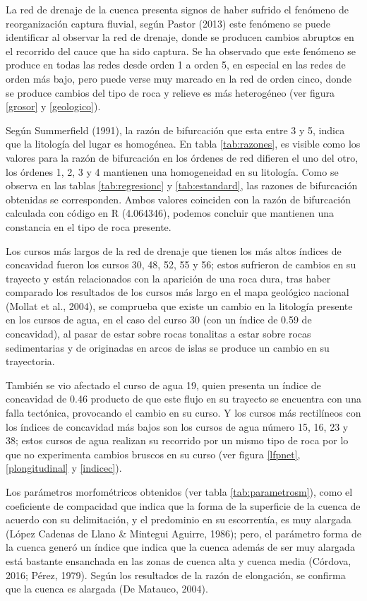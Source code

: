 \documentclass[11pt,]{article}
\begin{document}
La red de drenaje de la cuenca presenta signos de haber sufrido el
fenómeno de reorganización captura fluvial, según Pastor (2013) este
fenómeno se puede identificar al observar la red de drenaje, donde se
producen cambios abruptos en el recorrido del cauce que ha sido captura.
Se ha observado que este fenómeno se produce en todas las redes desde
orden 1 a orden 5, en especial en las redes de orden más bajo, pero
puede verse muy marcado en la red de orden cinco, donde se produce
cambios del tipo de roca y relieve es más heterogéneo (ver figura
\ref{grosor} y \ref{geologico}).

Según Summerfield (1991), la razón de bifurcación que esta entre 3 y 5,
indica que la litología del lugar es homogénea. En tabla
\ref{tab:razones}, es visible como los valores para la razón de
bifurcación en los órdenes de red difieren el uno del otro, los órdenes
1, 2, 3 y 4 mantienen una homogeneidad en su litología. Como se observa
en las tablas \ref{tab:regresionc} y \ref{tab:estandard}, las razones de
bifurcación obtenidas se corresponden. Ambos valores coinciden con la
razón de bifurcación calculada con código en R (4.064346), podemos
concluir que mantienen una constancia en el tipo de roca presente.

Los cursos más largos de la red de drenaje que tienen los más altos
índices de concavidad fueron los cursos 30, 48, 52, 55 y 56; estos
sufrieron de cambios en su trayecto y están relacionados con la
aparición de una roca dura, tras haber comparado los resultados de los
cursos más largo en el mapa geológico nacional (Mollat et al., 2004), se
comprueba que existe un cambio en la litología presente en los cursos de
agua, en el caso del curso 30 (con un índice de 0.59 de concavidad), al
pasar de estar sobre rocas tonalitas a estar sobre rocas sedimentarias y
de originadas en arcos de islas se produce un cambio en su trayectoria.

También se vio afectado el curso de agua 19, quien presenta un índice de
concavidad de 0.46 producto de que este flujo en su trayecto se
encuentra con una falla tectónica, provocando el cambio en su curso. Y
los cursos más rectilíneos con los índices de concavidad más bajos son
los cursos de agua número 15, 16, 23 y 38; estos cursos de agua realizan
su recorrido por un mismo tipo de roca por lo que no experimenta cambios
bruscos en su curso (ver figura \ref{lfpnet}, \ref{plongitudinal} y
\ref{indicec}).

Los parámetros morfométricos obtenidos (ver tabla
\ref{tab:parametrosm}), como el coeficiente de compacidad que indica que
la forma de la superficie de la cuenca de acuerdo con su delimitación, y
el predominio en su escorrentía, es muy alargada (López Cadenas de Llano
\& Mintegui Aguirre, 1986); pero, el parámetro forma de la cuenca generó
un índice que indica que la cuenca además de ser muy alargada está
bastante ensanchada en las zonas de cuenca alta y cuenca media (Córdova,
2016; Pérez, 1979). Según los resultados de la razón de elongación, se
confirma que la cuenca es alargada (De Matauco, 2004).
\end{document}
